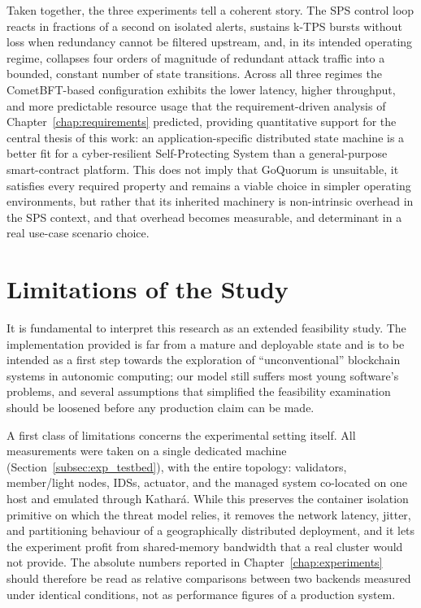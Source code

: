 Taken together, the three experiments tell a coherent story. The SPS control loop reacts in fractions of a second on isolated alerts, sustains k-TPS bursts without loss when redundancy cannot be filtered upstream, and, in its intended operating regime, collapses four orders of magnitude of redundant attack traffic into a bounded, constant number of state transitions. Across all three regimes the CometBFT-based configuration exhibits the lower latency, higher throughput, and more predictable resource usage that the requirement-driven analysis of Chapter~\ref{chap:requirements} predicted, providing quantitative support for the central thesis of this work: an application-specific distributed state machine is a better fit for a cyber-resilient Self-Protecting System than a general-purpose smart-contract platform. This does not imply that GoQuorum is unsuitable, it satisfies every required property and remains a viable choice in simpler operating environments, but rather that its inherited machinery is non-intrinsic overhead in the SPS context, and that overhead becomes measurable, and determinant in a real use-case scenario choice.

\section{Limitations of the Study}
\label{sec:conc_limitations}

It is fundamental to interpret this research as an extended feasibility study. The implementation provided is far from a mature and deployable state and is to be intended as a first step towards the exploration of ``unconventional'' blockchain systems in autonomic computing; our model still suffers most young software's problems, and several assumptions that simplified the feasibility examination should be loosened before any production claim can be made.

A first class of limitations concerns the experimental setting itself. All measurements were taken on a single dedicated machine (Section~\ref{subsec:exp_testbed}), with the entire topology: validators, member/light nodes, IDSs, actuator, and the managed system co-located on one host and emulated through Kathará. While this preserves the container isolation primitive on which the threat model relies, it removes the network latency, jitter, and partitioning behaviour of a geographically distributed deployment, and it lets the experiment profit from shared-memory bandwidth that a real cluster would not provide. The absolute numbers reported in Chapter~\ref{chap:experiments} should therefore be read as relative comparisons between two backends measured under identical conditions, not as performance figures of a production system.

